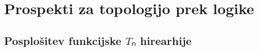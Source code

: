 \section{Prospekti za topologijo prek logike}
\label{sec:tvl}

\subsection{Posplošitev funkcijske \(Tₙ\) hirearhije}


